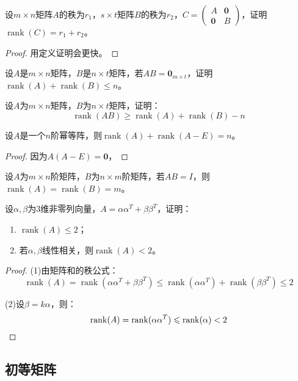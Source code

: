 \begin{theorem}
	设$m\times n$矩阵$A$的秩为$r_1$，$s\times t$矩阵$B$的秩为$r_2$，$C=
	\begin{pmatrix}
		A & \mathbf{0} \\
		\mathbf{0} & B
	\end{pmatrix}$，证明$\operatorname{rank}(C)=r_1+r_2$。
\end{theorem}
\begin{proof}
	用定义证明会更快。
\end{proof}
\begin{theorem}
	设$A$是$m\times n$矩阵，$B$是$n\times t$矩阵，若$AB=\mathbf{0}_{m\times t}$，证明$\operatorname{rank}(A)+\operatorname{rank}(B)\leqslant n$。
\end{theorem}
\begin{theorem}
	设$A$为$m\times n$矩阵，$B$为$n\times t$矩阵，证明：
	\begin{equation*}
		\operatorname{rank}(AB)\geqslant\operatorname{rank}(A)+\operatorname{rank}(B)-n
	\end{equation*}
\end{theorem}
\begin{theorem}
	设$A$是一个$n$阶幂等阵，则$\operatorname{rank}(A)+\operatorname{rank}(A-E)=n$。
\end{theorem}
\begin{proof}
	因为$A(A-E)=\mathbf{0}$，
\end{proof}
\begin{theorem}
	设$A$为$m\times n$阶矩阵，$B$为$n\times m$阶矩阵，若$AB=I$，则$\operatorname{rank}(A)=\operatorname{rank}(B)=m$。
\end{theorem}
\begin{theorem}
	设$\alpha,\beta$为$3$维非零列向量，$A=\alpha\alpha^T+\beta\beta^T$，证明：
	\begin{enumerate}
		\item $\operatorname{rank}(A)\leqslant2$；
		\item 若$\alpha,\beta$线性相关，则$\operatorname{rank}(A)<2$。
	\end{enumerate}
\end{theorem}
\begin{proof}
	(1)由矩阵和的秩公式：
	\begin{equation*}
		\operatorname{rank}(A)=\operatorname{rank}(\alpha\alpha^T+\beta\beta^T)\leqslant\operatorname{rank}(\alpha\alpha^T)+\operatorname{rank}(\beta\beta^T)\leqslant2
	\end{equation*}\par
	(2)设$\beta=k\alpha$，则：
	\begin{equation*}
		\operatorname{rank}(A)=\operatorname{rank}(\alpha\alpha^T)\leqslant\operatorname{rank}(\alpha)<2\qedhere
	\end{equation*}
\end{proof}

\subsection{初等矩阵}